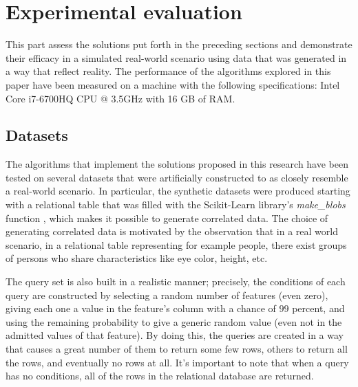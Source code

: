 \section{Experimental evaluation} 
\label{experimental_evalutation}
This part assess the solutions put forth in the preceding sections and demonstrate their efficacy in a simulated real-world scenario using data that was generated in a way that reflect reality. The performance of the algorithms explored in this paper have been measured on a machine with the following  specifications: Intel Core i7-6700HQ CPU @ 3.5GHz with 16 GB of RAM.


\subsection{Datasets}
The algorithms that implement the solutions proposed in this research have been tested on several datasets that were artificially constructed to as closely resemble a real-world scenario.
In particular, the synthetic datasets were produced starting with a relational table that was filled with the Scikit-Learn library's \emph{make\_blobs} function \cite{scikit-learn}, which makes it possible to generate correlated data. The choice of generating correlated data is motivated by the observation that in a real world scenario, in a relational table representing for example people, there exist groups of persons who share characteristics like eye color, height, etc. 

The query set is also built in a realistic manner; precisely, the conditions of each query are constructed by selecting a random number of features (even zero), giving each one a value in the feature's column with a chance of $99$ percent, and using the remaining probability to give a generic random value (even not in the admitted values of that feature). By doing this, the queries are created in a way that causes a great number of them to return some few rows, others to return all the rows, and eventually no rows at all. It's important to note that when a query has no conditions, all of the rows in the relational database are returned. 

